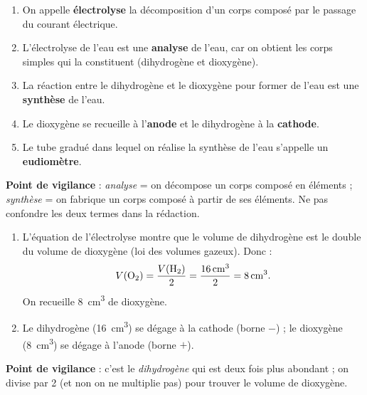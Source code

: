 \documentclass[11pt]{article}
\newcommand{\cle}[1]{{\popxbold\color{popdark}#1}}
\begin{document}
\begin{corrige}
\begin{enumerate}
\item On appelle \textbf{électrolyse} la décomposition d'un corps composé par le passage du courant électrique.
\item L'électrolyse de l'eau est une \textbf{analyse} de l'eau, car on obtient les corps simples qui la constituent (dihydrogène et dioxygène).
\item La réaction entre le dihydrogène et le dioxygène pour former de l'eau est une \textbf{synthèse} de l'eau.
\item Le dioxygène se recueille à l'\textbf{anode} et le dihydrogène à la \textbf{cathode}.
\item Le tube gradué dans lequel on réalise la synthèse de l'eau s'appelle un \textbf{eudiomètre}.
\end{enumerate}
\textbf{Point de vigilance} : \emph{analyse} = on décompose un corps composé en éléments ; \emph{synthèse} = on fabrique un corps composé à partir de ses éléments. Ne pas confondre les deux termes dans la rédaction.
\end{corrige}

\begin{corrige}
\begin{enumerate}
\item L'équation de l'électrolyse  montre que le volume de dihydrogène est le double du volume de dioxygène (loi des volumes gazeux). Donc :
\[ V(\ce{O2}) = \frac{V(\ce{H2})}{2} = \frac{\SI{16}{cm^3}}{2} = \SI{8}{cm^3}. \]
On recueille \SI{8}{cm^3} de dioxygène.
\item Le dihydrogène (\SI{16}{cm^3}) se dégage à la \cle{cathode} (borne $-$) ; le dioxygène (\SI{8}{cm^3}) se dégage à l'\cle{anode} (borne $+$).
\end{enumerate}
\textbf{Point de vigilance} : c'est le \emph{dihydrogène} qui est deux fois plus abondant ; on divise par 2 (et non on ne multiplie pas) pour trouver le volume de dioxygène.
\end{corrige}
\end{document}
